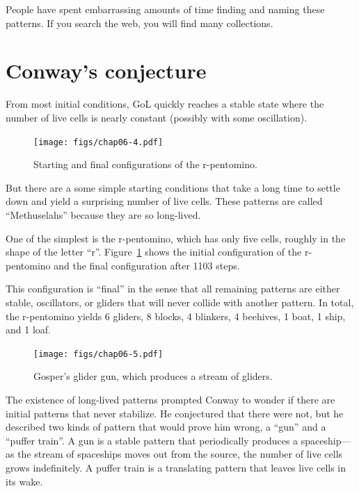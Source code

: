 \documentclass[12pt]{book}
\theoremstyle{exercise}
\begin{document}
People have spent embarrassing
amounts of time finding and naming these patterns.  If you search
the web, you will find many collections.

\section{Conway's conjecture}

From most initial conditions, GoL quickly reaches a stable
state where the number of live cells is nearly constant
(possibly with some oscillation).

\begin{figure}
\centerline{\texttt{[image: figs/chap06-4.pdf]}}
\caption{Starting and final configurations of the r-pentomino.}
\label{chap06-4}
\end{figure}

But there are a some simple starting conditions that take a
long time to settle down and yield a surprising
number of live cells.  These patterns are called ``Methuselahs''
because they are so long-lived.


One of the simplest is the
r-pentomino, which has only five cells, roughly in the shape of the
letter ``r''.  Figure~\ref{chap06-4} shows the initial configuration
of the r-pentomino and the final configuration after 1103 steps.

This configuration is ``final'' in the sense that all remaining
patterns are either stable, oscillators, or gliders that will never
collide with another pattern.  In total, the r-pentomino yields 6
gliders, 8 blocks, 4 blinkers, 4 beehives, 1 boat, 1 ship, and 1 loaf.



\begin{figure}
\centerline{\texttt{[image: figs/chap06-5.pdf]}}
\caption{Gosper's glider gun, which produces a stream of gliders.}
\label{chap06-5}
\end{figure}

The existence of long-lived patterns prompted Conway to wonder if
there are initial patterns that never stabilize.  He
conjectured that there were not, but he described two kinds of pattern
that would prove him wrong, a ``gun'' and a ``puffer train''.  A gun
is a stable pattern that periodically produces a spaceship---as the
stream of spaceships moves out from the source, the number of live
cells grows indefinitely.  A puffer train is a translating pattern
that leaves live cells in its wake.
\end{document}
